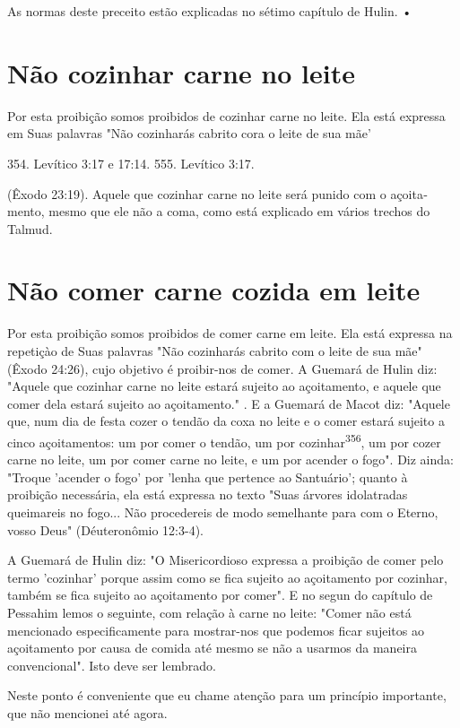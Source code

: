 As normas deste preceito estão explicadas no sétimo capítulo de Hulin. •


\section{Não cozinhar carne no leite}

Por esta proibição somos proibidos de cozinhar carne no leite. Ela está
expressa em Suas palavras "Não cozinharás cabrito cora o leite de sua
mãe'

354. Levítico 3:17 e 17:14. 555. Levítico 3:17.

(Êxodo 23:19). Aquele que cozinhar carne no leite será punido com o
açoita­mento, mesmo que ele não a coma, como está explicado em vários
trechos do Talmud.

\section{Não comer carne cozida em leite}

Por esta proibição somos proibidos de comer carne em leite. Ela es­tá
expressa na repetiçào de Suas palavras "Não cozinharás cabrito com o
leite de sua mãe" (Êxodo 24:26), cujo objetivo é proibir-nos de comer. A
Guemará de Hulin diz: "Aquele que cozinhar carne no leite estará sujeito
ao açoitamen­to, e aquele que comer dela estará sujeito ao açoitamento."
. E a Guemará de Macot diz: "Aquele que, num dia de festa cozer o tendão
da coxa no leite e o comer estará sujeito a cinco açoitamentos: um por
comer o tendão, um por cozinhar\textsuperscript{356}, um por cozer carne
no leite, um por comer carne no leite, e um por acender o fogo". Diz
ainda: "Troque 'acender o fogo' por 'lenha que per­tence ao Santuário';
quanto à proibição necessária, ela está expressa no texto "Suas árvores
idolatradas queimareis no fogo... Não procedereis de modo se­melhante
para com o Eterno, vosso Deus" (Déuteronômio 12:3-4).

A Guemará de Hulin diz: "O Misericordioso expressa a proibição de comer
pelo termo 'cozinhar' porque assim como se fica sujeito ao açoitamento
por cozinhar, também se fica sujeito ao açoitamento por comer". E no
segun do capítulo de Pessahim lemos o seguinte, com relação à carne no
leite: "Co­mer não está mencionado especificamente para mostrar-nos que
podemos fi­car sujeitos ao açoitamento por causa de comida até mesmo se
não a usarmos da maneira convencional". Isto deve ser lembrado.

Neste ponto é conveniente que eu chame atenção para um princípio
importante, que não mencionei até agora.

